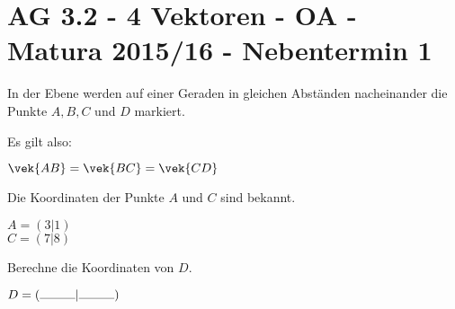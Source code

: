 \section{AG 3.2 - 4 Vektoren - OA - Matura 2015/16
- Nebentermin 1}

\begin{beispiel}[AG 3.2]{1} %
In der Ebene werden auf einer Geraden in gleichen Abständen nacheinander die Punkte $A,B,C$ und $D$ markiert. \leer

Es gilt also:

$\vek{AB}=\vek{BC}=\vek{CD}$ \leer

Die Koordinaten der Punkte $A$ und $C$ sind bekannt. \leer

$A=(3|1)$ \\
$C=(7|8)$ \leer

Berechne die Koordinaten von $D$.\leer

$D=(\rule{1cm}{0.3pt}|\rule{1cm}{0.3pt})$

\end{beispiel}